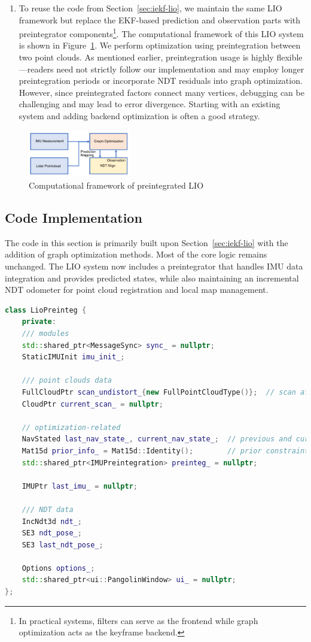 \begin{enumerate}
	\item To reuse the code from Section~\ref{sec:iekf-lio}, we maintain the same LIO framework but replace the EKF-based prediction and observation parts with preintegrator components\footnote{In practical systems, filters can serve as the frontend while graph optimization acts as the keyframe backend.}. The computational framework of this LIO system is shown in Figure~\ref{fig:framework-lio-preinteg}. We perform optimization using preintegration between two point clouds. As mentioned earlier, preintegration usage is highly flexible—readers need not strictly follow our implementation and may employ longer preintegration periods or incorporate NDT residuals into graph optimization. However, since preintegrated factors connect many vertices, debugging can be challenging and may lead to error divergence. Starting with an existing system and adding backend optimization is often a good strategy.
\end{enumerate}

\begin{figure}[!t]
	\centering
	\includegraphics[width=0.4\textwidth]{resources/lio/lio-preinteg.pdf}
	\caption{Computational framework of preintegrated LIO}
	\label{fig:framework-lio-preinteg}
\end{figure}

\subsection{Code Implementation}  
The code in this section is primarily built upon Section~\ref{sec:iekf-lio} with the addition of graph optimization methods. Most of the core logic remains unchanged. The LIO system now includes a preintegrator that handles IMU data integration and provides predicted states, while also maintaining an incremental NDT odometer for point cloud registration and local map management.

\begin{lstlisting}[language=c++,caption=src/ch8/lio-preinteg/lio_preinteg.h]
class LioPreinteg {
	private:
	/// modules
	std::shared_ptr<MessageSync> sync_ = nullptr;
	StaticIMUInit imu_init_;
	
	/// point clouds data
	FullCloudPtr scan_undistort_{new FullPointCloudType()};  // scan after undistortion
	CloudPtr current_scan_ = nullptr;
	
	// optimization-related
	NavStated last_nav_state_, current_nav_state_;  // previous and current states  
	Mat15d prior_info_ = Mat15d::Identity();        // prior constraint
	std::shared_ptr<IMUPreintegration> preinteg_ = nullptr;
	
	IMUPtr last_imu_ = nullptr;
	
	/// NDT data
	IncNdt3d ndt_;
	SE3 ndt_pose_;
	SE3 last_ndt_pose_;
	
	Options options_;
	std::shared_ptr<ui::PangolinWindow> ui_ = nullptr;
};
\end{lstlisting}

